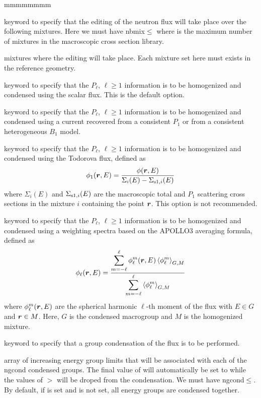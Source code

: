 \begin{ListeDeDescription}{mmmmmmmm}
\item[\moc{MIX}] keyword to specify that the editing of the neutron
flux will take place over the following mixtures. Here
we must have nbmix$\le$ where  is the maximum number
of mixtures in the macroscopic cross section library.  

\item[\dusa{imixt}] mixtures where the editing will take place.
Each mixture set here must exists in the reference geometry.

\item[\moc{P0W}] keyword to specify that the $P_\ell$, $\ell\ge 1$ information is to be
homogenized and condensed using the scalar flux. This is the default option.

\item[\moc{P1W\_L}] keyword to specify that the $P_\ell$, $\ell\ge 1$ information is to be
homogenized and condensed using a current recovered from a consistent $P_1$ or
from a consistent heterogeneous $B_1$ model.

\item[\moc{P1W\_TO}] keyword to specify that the $P_\ell$, $\ell\ge 1$ information is to be
homogenized and condensed using the Todorova flux\cite{todorova}, defined as
$$
\phi_1(\bff(r),E)={\phi(\bff(r),E)\over \Sigma_i(E)-\Sigma_{{\rm s1},i}(E)}
$$
\noindent where $\Sigma_i(E)$ and $\Sigma_{{\rm s1},i}(E)$ are the macroscopic total and $P_1$ scattering
cross sections in the mixture $i$ containing the point $\bff(r)$. This option is not recommended.

\item[\moc{PNW\_SP}] keyword to specify that the $P_\ell$, $\ell\ge 1$ information is to be
homogenized and condensed using a weighting spectra based on the APOLLO3 averaging formula\cite{condPn}, defined as
$$
\phi_\ell(\bff(r),E)={ \displaystyle\sum_{m=-\ell}^\ell \phi_\ell^m(\bff(r),E) \left<\phi_\ell^m\right>_{G,M} \over \displaystyle\sum_{m=-\ell}^\ell \left<\phi_\ell^m\right>_{G,M} }
$$
where $\phi_\ell^m(\bff(r),E)$ are the spherical harmonic $\ell$-th moment of the flux with $E \in G$ and $\bff(r) \in M$. Here, $G$ is the
condensed macrogroup and $M$ is the homogenized mixture.

\item[\moc{COND}] keyword to specify that a group condensation of the flux is
to be performed.

\item[\dusa{icond}] array of increasing energy group limits that will be associated with
each of the ngcond condensed groups. The final value of
 will automatically be set to  while the values of 
$>$ will be droped from the condensation. 
We must have ngcond$\le$. By default, if  is set and 
is not set, all energy groups are condensed together.


\end{ListeDeDescription}
